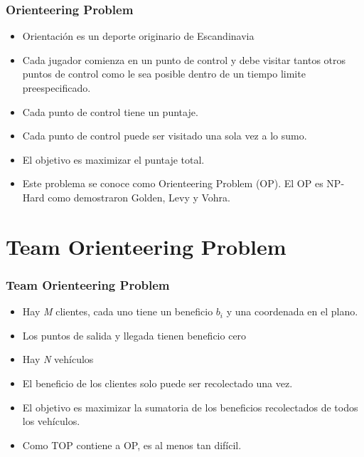 \documentclass{beamer}
\begin{document}
\begin{frame}
\frametitle{Orienteering Problem}

\begin{itemize}
    \item Orientaci\'on es un deporte originario de Escandinavia
    \pause
    \item Cada jugador comienza en un punto de control y debe visitar tantos otros puntos de control como le sea posible dentro de un tiempo limite preespecificado. 
    \pause
    \item Cada punto de control tiene un puntaje.
    \pause
    \item Cada punto de control puede ser visitado una sola vez a lo sumo.
    \pause
    \item El objetivo es maximizar el puntaje total.
    \pause
    \item Este problema se conoce como Orienteering Problem (OP). El OP es NP-Hard como demostraron Golden, Levy y Vohra.
\end{itemize}

\end{frame}


\section{Team Orienteering Problem}

\begin{frame}
\frametitle{Team Orienteering Problem}

\begin{itemize}
    \item Hay \textit{M} clientes, cada uno tiene un beneficio $b_i$ y una coordenada en el plano.
    \pause
    \item Los puntos de salida y llegada tienen beneficio cero
    \pause    
    \item Hay \textit{N} veh\'iculos
    \pause
    \item El beneficio de los clientes solo puede ser recolectado una vez.
    \pause
    \item El objetivo es maximizar la sumatoria de los beneficios recolectados de todos los vehículos.
    \pause
    \item Como TOP contiene a OP, es al menos tan dif\'icil.
\end{itemize}

\end{frame}
\end{document}
